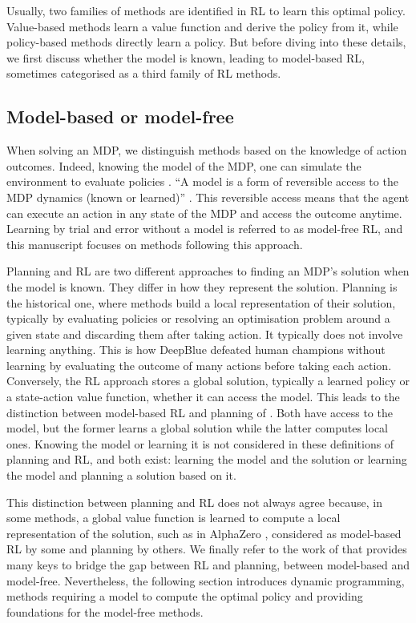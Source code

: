 Usually, two families of methods are identified in RL to learn this optimal policy.
Value-based methods learn a value function and derive the policy from it, while policy-based methods directly learn a policy.
But before diving into these details, we first discuss whether the model is known, leading to model-based RL, sometimes categorised as a third family of RL methods.

\subsection{Model-based or model-free}
\label{sec:ch2_model_based_vs_model_free}

When solving an MDP, we distinguish methods based on the knowledge of action outcomes.
Indeed, knowing the model of the MDP, one can simulate the environment to evaluate policies \citep{sutton2018reinforcement}.
``A model is a form of reversible access to the MDP dynamics (known or learned)'' \citep{moerland2023model}.
This reversible access means that the agent can execute an action in any state of the MDP and access the outcome anytime.
Learning by trial and error without a model is referred to as model-free RL, and this manuscript focuses on methods following this approach.

Planning and RL are two different approaches to finding an MDP's solution when the model is known.
They differ in how they represent the solution.
Planning is the historical one, where methods build a local representation of their solution, typically by evaluating policies or resolving an optimisation problem around a given state and discarding them after taking action.
It typically does not involve learning anything.
This is how DeepBlue \citep{campbell2002deep} defeated human champions without learning by evaluating the outcome of many actions before taking each action.
Conversely, the RL approach stores a global solution, typically a learned policy or a state-action value function, whether it can access the model.
This leads to the distinction between model-based RL and planning of \cite{moerland2023model}.
Both have access to the model, but the former learns a global solution while the latter computes local ones.
Knowing the model or learning it is not considered in these definitions of planning and RL, and both exist: learning the model and the solution or learning the model and planning a solution based on it.

This distinction between planning and RL does not always agree because, in some methods, a global value function is learned to compute a local representation of the solution, such as in AlphaZero \citep{silver2018general}, considered as model-based RL by some and planning by others.
We finally refer to the work of \cite{moerland2023model} that provides many keys to bridge the gap between RL and planning, between model-based and model-free.
Nevertheless, the following section introduces dynamic programming, methods requiring a model to compute the optimal policy and providing foundations for the model-free methods.

